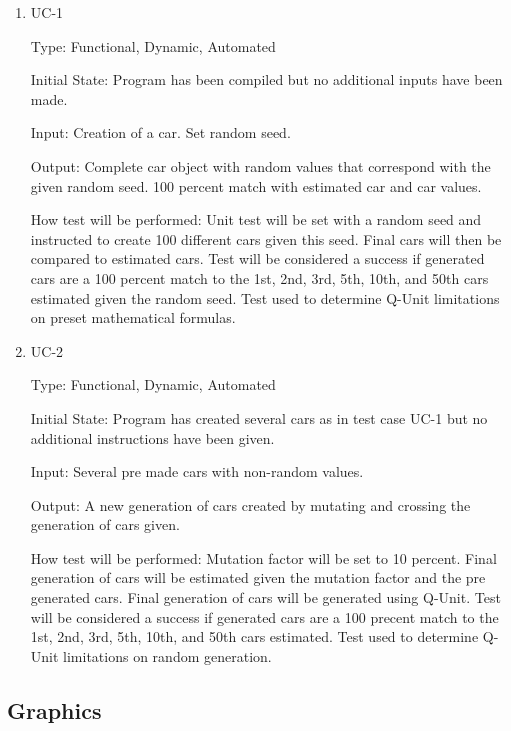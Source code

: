 \documentclass[12pt, titlepage]{article}
\begin{document}
\begin{enumerate}

\item{UC-1\\}

Type: Functional, Dynamic, Automated
					
Initial State: Program has been compiled but no additional inputs have been made.
					
Input: Creation of a car. Set random seed.
					
Output: Complete car object with random values that correspond with the given random seed. 100 percent match with estimated car and car values.
					
How test will be performed: Unit test will be set with a random seed and instructed to create 100 different cars given this seed. Final cars will then be compared to estimated cars. Test will be considered a success if generated cars are a 100 percent match to the 1st, 2nd, 3rd, 5th, 10th, and 50th cars estimated given the random seed. Test used to determine Q-Unit limitations on preset mathematical formulas.
					
\item{UC-2\\}

Type: Functional, Dynamic, Automated
					
Initial State: Program has created several cars as in test case UC-1 but no additional instructions have been given.
					
Input: Several pre made cars with non-random values.
					
Output: A new generation of cars created by mutating and crossing the generation of cars given.
					
How test will be performed: Mutation factor will be set to 10 percent. Final generation of cars will be estimated given the mutation factor and the pre generated cars. Final generation of cars will be generated using Q-Unit. Test will be considered a success if generated cars are a 100 precent match to the 1st, 2nd, 3rd, 5th, 10th, and 50th cars estimated. Test used to determine Q-Unit limitations on random generation.

\end{enumerate}

\subsection{Graphics}
\end{document}
